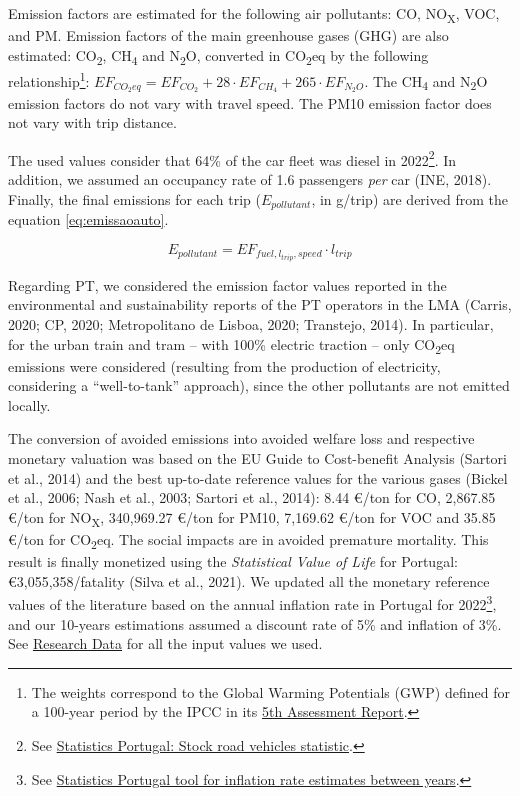 \documentclass[review, doubleblind, 3p,
authoryear]{elsarticle} %
\begin{document}
Emission factors are estimated for the following air pollutants: CO,
NO\textsubscript{X}, VOC, and PM. Emission factors of the main
greenhouse gases (GHG) are also estimated: CO\textsubscript{2},
CH\textsubscript{4} and N\textsubscript{2}O, converted in
CO\textsubscript{2}eq by the following relationship\footnote{The weights
  correspond to the Global Warming Potentials (GWP) defined for a
  100-year period by the IPCC in its
  \href{https://www.ipcc.ch/report/ar5/}{5th Assessment Report}.}:
\(EF_{CO_2eq} = EF_{CO_2} + 28\cdot EF_{CH_4} + 265\cdot EF_{N_2O}\).
The CH\textsubscript{4} and N\textsubscript{2}O emission factors do not
vary with travel speed. The PM10 emission factor does not vary with trip
distance.

The used values consider that 64\% of the car fleet was diesel in
2022\footnote{See
  \href{https://smi.ine.pt/Indicador/Detalhes/10837?LANG=EN}{Statistics
  Portugal: Stock road vehicles statistic}.}. In addition, we assumed an
occupancy rate of 1.6 passengers \emph{per} car (INE, 2018). Finally,
the final emissions for each trip (\(E_{pollutant}\), in g/trip) are
derived from the equation \ref{eq:emissaoauto}.

\begin{equation}\label{eq:emissaoauto}
{E}_{pollutant} = {EF}_{fuel,l_{trip},speed}\cdot l_{trip}
\end{equation}

Regarding PT, we considered the emission factor values reported in the
environmental and sustainability reports of the PT operators in the LMA
(Carris, 2020; CP, 2020; Metropolitano de Lisboa, 2020; Transtejo,
2014). In particular, for the urban train and tram -- with 100\%
electric traction -- only CO\textsubscript{2}eq emissions were
considered (resulting from the production of electricity, considering a
``well-to-tank'' approach), since the other pollutants are not emitted
locally.

The conversion of avoided emissions into avoided welfare loss and
respective monetary valuation was based on the EU Guide to Cost-benefit
Analysis (Sartori et al., 2014) and the best up-to-date reference values
for the various gases (Bickel et al., 2006; Nash et al., 2003; Sartori
et al., 2014): 8.44 €/ton for CO, 2,867.85 €/ton for
NO\textsubscript{X}, 340,969.27 €/ton for PM10, 7,169.62 €/ton for VOC
and 35.85 €/ton for CO\textsubscript{2}eq. The social impacts are in
avoided premature mortality. This result is finally monetized using the
\emph{Statistical Value of Life} for Portugal: €3,055,358/fatality
(Silva et al., 2021). We updated all the monetary reference values of
the literature based on the annual inflation rate in Portugal for
2022\footnote{See
  \href{https://www.ine.pt/xportal/xmain?xpid=INE\&xpgid=ipc}{Statistics
  Portugal tool for inflation rate estimates between years}.}, and our
10-years estimations assumed a discount rate of 5\% and inflation of
3\%. See \protect\hyperlink{research-data}{Research Data} for all the
input values we used.
\end{document}
